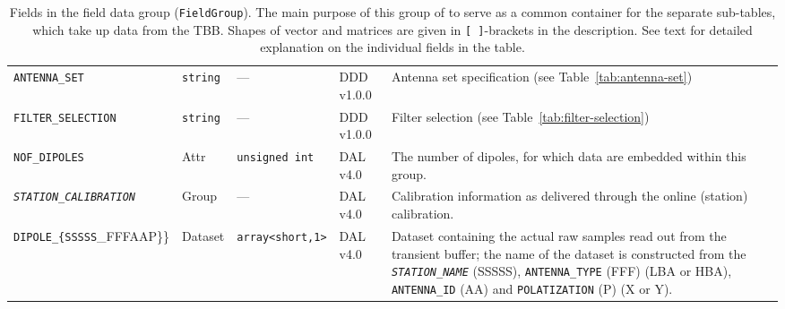\documentclass[a4paper,10pt,bibtotoc]{scrartcl}
\begin{document}
\begin{table}[htbp]
\begin{tabular}{|llllp{4.5cm}|}
    \small\verb|ANTENNA_SET| & \small\verb|string| & ---  & DDD v1.0.0 & Antenna set specification (see Table~\ref{tab:antenna-set}) \\
    \small \verb|FILTER_SELECTION| & \small\verb|string| & ---  & DDD v1.0.0 & Filter selection (see Table~\ref{tab:filter-selection}) \\
    \small {\texttt{NOF\_DIPOLES}} & Attr & \verb|unsigned int| & DAL v4.0 & The number of dipoles, for which data are embedded within this group. \\
    \hline
    \small \textit{\texttt{STATION\_CALIBRATION}} & Group & --- & DAL v4.0 & Calibration information as delivered through the online (station) calibration. \\
    \small {\texttt{DIPOLE\_\{SSSSS}\_{FFFAAP\}\}}} & Dataset & \verb|array<short,1>| & DAL v4.0 & Dataset containing the actual raw samples read out from the transient buffer; the name of the dataset is constructed from the \small \textit{\texttt{STATION\_NAME}} (SSSSS), \verb|ANTENNA_TYPE| (FFF) (LBA or HBA), \verb|ANTENNA_ID| (AA) and \verb|POLATIZATION| (P) (X or Y). \\
  \end{tabular}
  \caption[Fields in the field data group (\texttt{FieldGroup}).]{
    Fields in the field data group (\texttt{FieldGroup}). The
    main purpose of this group of to serve as a common container for the separate
    sub-tables, which take up data from the TBB. Shapes of vector and matrices are given in
    \texttt{[ ]}-brackets in the description. See text for detailed explanation
    on the individual fields in the table.}
  \label{tab:field group}
\end{table}
\end{document}
